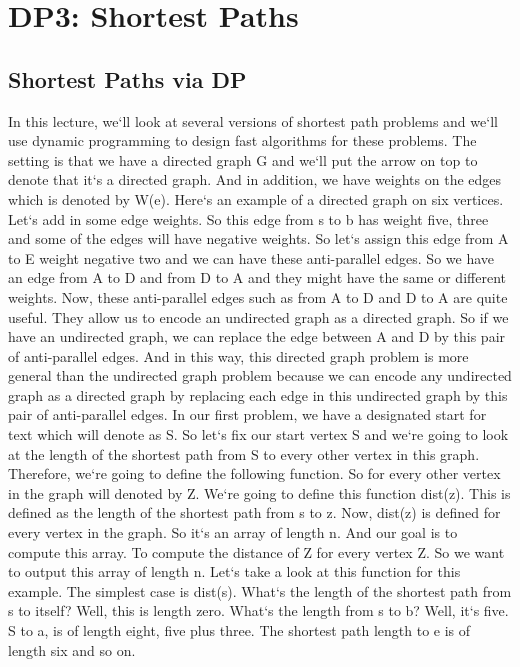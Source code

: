 \section{DP3: Shortest Paths}

\subsection{Shortest Paths via DP}
In this lecture, we`ll look at several versions of shortest path problems and we`ll use dynamic programming to design fast algorithms for these problems.
The setting is that we have a directed graph G and we`ll put the arrow on top to denote that it`s a directed graph.
And in addition, we have weights on the edges which is denoted by W(e).
Here`s an example of a directed graph on six vertices.
Let`s add in some edge weights.
So this edge from s to b has weight five, three and some of the edges will have negative weights.
So let`s assign this edge from A to E weight negative two and we can have these anti-parallel edges.
So we have an edge from A to D and from D to A and they might have the same or different weights.
Now, these anti-parallel edges such as from A to D and D to A are quite useful.
They allow us to encode an undirected graph as a directed graph.
So if we have an undirected graph, we can replace the edge between A and D by this pair of anti-parallel edges.
And in this way, this directed graph problem is more general than the undirected graph problem because we can encode any undirected graph as a directed graph by replacing each edge in this undirected graph by this pair of anti-parallel edges.
In our first problem, we have a designated start for text which will denote as S\@.
So let`s fix our start vertex S and we`re going to look at the length of the shortest path from S to every other vertex in this graph.
Therefore, we`re going to define the following function.
So for every other vertex in the graph will denoted by Z\@.
We`re going to define this function dist(z).
This is defined as the length of the shortest path from s to z.
Now, dist(z) is defined for every vertex in the graph.
So it`s an array of length n.
And our goal is to compute this array.
To compute the distance of Z for every vertex Z\@.
So we want to output this array of length n.
Let`s take a look at this function for this example.
The simplest case is dist(s).
What`s the length of the shortest path from s to itself? Well, this is length zero.
What`s the length from s to b? Well, it`s five.
S to a, is of length eight, five plus three.
The shortest path length to e is of length six and so on.
